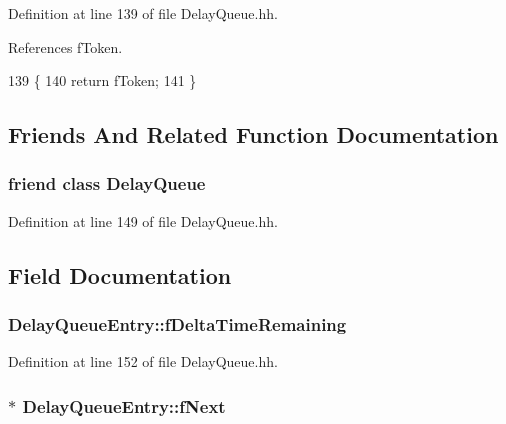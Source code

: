 Definition at line 139 of file Delay\+Queue.\+hh.



References f\+Token.


\begin{DoxyCode}
139                    \{
140     \textcolor{keywordflow}{return} fToken;
141   \}
\end{DoxyCode}


\subsection{Friends And Related Function Documentation}
\subsubsection[{Delay\+Queue}]{\setlength{\rightskip}{0pt plus 5cm}friend class {\bf Delay\+Queue}\hspace{0.3cm}{\ttfamily [friend]}}\label{classDelayQueueEntry_a1fd26f07bb5eaba5df4fe6eed5c1bf30}


Definition at line 149 of file Delay\+Queue.\+hh.



\subsection{Field Documentation}
\subsubsection[{f\+Delta\+Time\+Remaining}]{ Delay\+Queue\+Entry\+::f\+Delta\+Time\+Remaining\hspace{0.3cm}{\ttfamily [private]}}\label{classDelayQueueEntry_a68a7578179260ad40cb4f8fbde38e491}


Definition at line 152 of file Delay\+Queue.\+hh.

\subsubsection[{f\+Next}]{$\ast$ Delay\+Queue\+Entry\+::f\+Next\hspace{0.3cm}{\ttfamily [private]}}\label{classDelayQueueEntry_a3a2ccdcdcac760623833136b5ced2410}


